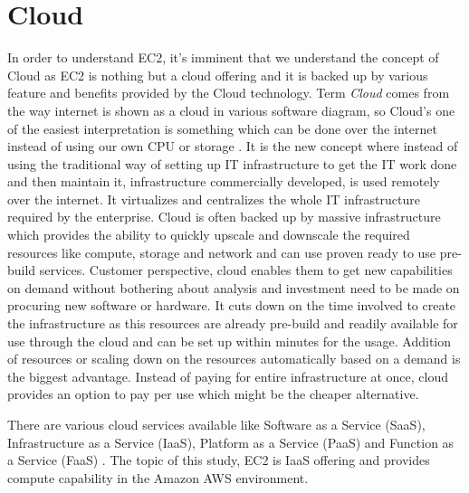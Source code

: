 \section{Cloud}
In order to understand EC2, it's imminent that we understand the concept of Cloud as EC2 is nothing but a cloud offering and it is backed up by various feature and benefits provided by the Cloud technology.  Term \emph{Cloud} comes from the way internet is shown as a cloud in various software diagram, so Cloud's one of the easiest interpretation is something which can be done over the internet instead of using our own CPU or storage \cite{www-infoworld}. It is the new concept where instead of using the traditional way of setting up IT infrastructure to get the IT work done and then maintain it, infrastructure commercially developed, is used remotely over the internet. It virtualizes and centralizes the whole IT infrastructure required by the enterprise. Cloud is often backed up by massive infrastructure which provides the ability to quickly upscale and downscale the required resources like compute, storage and network and can use proven ready to use pre-build services. Customer perspective, cloud enables them to get new capabilities on demand without bothering about analysis and investment need to be made on procuring new software or hardware. It cuts down on the time involved to create the infrastructure as this resources are already pre-build and readily available for use through the cloud and can be set up within minutes for the usage. Addition of resources or scaling down on the resources automatically based on a demand is the biggest advantage. Instead of paying for entire infrastructure at once, cloud provides an option to pay per use which might be the cheaper alternative.

There are various cloud services available like Software as a Service (SaaS), Infrastructure as a Service (IaaS), Platform as a Service (PaaS) and Function as a Service (FaaS) \cite{www-infoworld}. The topic of this study, EC2 is IaaS offering and provides compute capability in the Amazon AWS environment.


